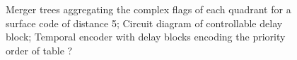 \documentclass[conference]{IEEEtran}
\begin{document}
\begin{figure}

\caption[]{
   Merger trees aggregating the complex flags of each quadrant for a surface code of distance 5;
 Circuit diagram of controllable delay block;
 Temporal encoder with delay blocks encoding the priority order of table ?}%
    \end{figure}



\end{document}

